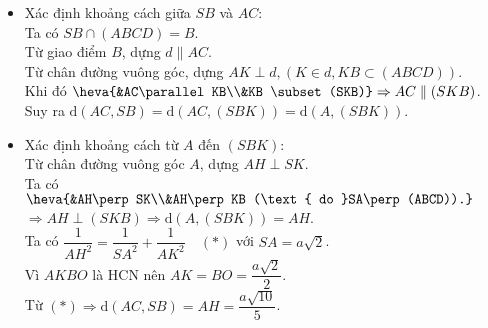 \begin{vd}
{\begin{itemize}
{\begin{tikzpicture}[scale=.9, font=\footnotesize, line join=round, line cap=round, >=stealth,transform shape]
				\end{tikzpicture}
			} 
			\item Xác định khoảng cách giữa $SB$ và $AC$:\\
			Ta có $SB\cap (ABCD)=B$.\\
			Từ giao điểm $B$, dựng $d\parallel AC$.\\
			Từ chân đường vuông góc, dựng $AK\perp d, (K\in d, KB\subset(ABCD))$.\\
			Khi đó $\heva{&AC\parallel KB\\&KB \subset(SKB)}\Rightarrow AC\parallel (SKB)$.\\
			Suy ra $\mathrm{d}(AC,SB)=\mathrm{d}(AC,(SBK))=\mathrm{d}(A,(SBK))$.
			\item Xác định khoảng cách từ $A$ đến $(SBK)$:\\
			Từ chân đường vuông góc $A$, dựng $AH\perp SK$.\\
			Ta có $\heva{&AH\perp SK\\&AH\perp KB (\text{ do }SA\perp (ABCD)).}$\\
			$\Rightarrow AH \perp (SKB)\Rightarrow \mathrm{d}(A,(SBK))=AH$.\\
			Ta có $\dfrac{1}{AH^2}=\dfrac{1}{SA^2}+\dfrac{1}{AK^2}\quad (*)$ với $SA=a\sqrt{2}$.\\
			Vì $AKBO$ là HCN nên $AK=BO=\dfrac{a\sqrt{2}}{2}$.\\
			Từ $(*)\Rightarrow \mathrm{d}(AC,SB)=AH=\dfrac{a\sqrt{10}}{5}$.
		\end{itemize}
	}
\end{vd}

